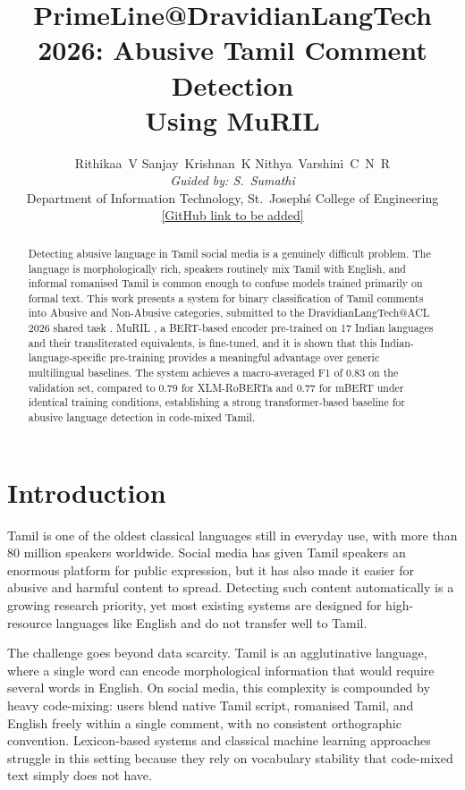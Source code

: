 \documentclass[11pt]{article}
\title{PrimeLine@DravidianLangTech 2026: Abusive Tamil Comment Detection\\Using MuRIL}
\author{Rithikaa~V \quad Sanjay~Krishnan~K \quad Nithya~Varshini~C~N~R \\
  \textit{Guided by: S.~Sumathi} \\
  Department of Information Technology, St.~Joseph\'s College of Engineering \\
  \url{[GitHub link to be added]}
}
\begin{document}
\maketitle

\begin{abstract}
Detecting abusive language in Tamil social media is a genuinely difficult problem.
The language is morphologically rich, speakers routinely mix Tamil with English,
and informal romanised Tamil is common enough to confuse models trained primarily
on formal text. This work presents a system for binary classification of Tamil
comments into Abusive and Non-Abusive categories, submitted to the
DravidianLangTech@ACL 2026 shared task \citep{abusive-tamil-women-dravidianlangtech-acl-2026}.
MuRIL \citep{khanuja2021}, a BERT-based encoder pre-trained on 17 Indian languages
and their transliterated equivalents, is fine-tuned, and it is shown that this
Indian-language-specific pre-training provides a meaningful advantage over generic
multilingual baselines. The system achieves a macro-averaged F1 of 0.83 on the
validation set, compared to 0.79 for XLM-RoBERTa and 0.77 for mBERT under identical
training conditions, establishing a strong transformer-based baseline for abusive
language detection in code-mixed Tamil.
\end{abstract}

\section{Introduction}

Tamil is one of the oldest classical languages still in everyday use, with more than
80 million speakers worldwide. Social media has given Tamil speakers an enormous
platform for public expression, but it has also made it easier for abusive and harmful
content to spread. Detecting such content automatically is a growing research priority,
yet most existing systems are designed for high-resource languages like English and do
not transfer well to Tamil.

The challenge goes beyond data scarcity. Tamil is an agglutinative language, where a
single word can encode morphological information that would require several words in
English. On social media, this complexity is compounded by heavy code-mixing: users
blend native Tamil script, romanised Tamil, and English freely within a single comment,
with no consistent orthographic convention. Lexicon-based systems and classical machine
learning approaches struggle in this setting because they rely on vocabulary stability
that code-mixed text simply does not have.
\end{document}
